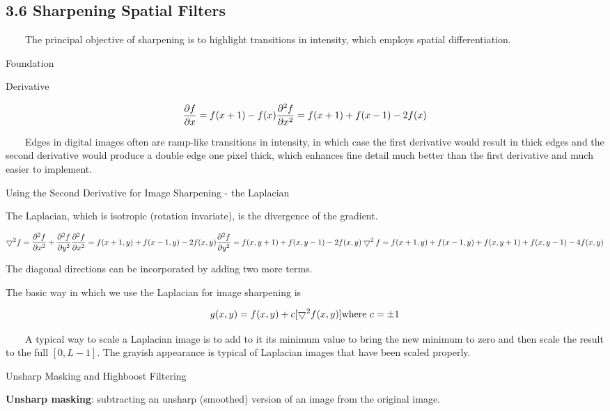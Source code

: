 \documentclass[]{article}
\begin{document}
\subsection{3.6 Sharpening Spatial Filters}\label{header-n299}

\(\quad\quad\)The principal objective of sharpening is to highlight
transitions in intensity, which employs spatial differentiation.

Foundation

Derivative

\[\dfrac{\partial f}{\partial x}=f(x+1)-f(x) \\
\dfrac{\partial^2 f}{\partial x^2}=f(x+1)+f(x-1)-2f(x)\]

\(\quad\quad\)Edges in digital images often are ramp-like transitions in
intensity, in which case the first derivative would result in thick
edges and the second derivative would produce a double edge one pixel
thick, which enhances fine detail much better than the first derivative
and much easier to implement.

Using the Second Derivative for Image Sharpening - the Laplacian

The Laplacian, which is isotropic (rotation invariate), is the
divergence of the gradient.

\[\bigtriangledown^2f=\dfrac{\partial^2f}{\partial x^2}+\dfrac{\partial^2f}{\partial y^2}\\
\dfrac{\partial^2f}{\partial x^2}=f(x+1,y)+f(x-1,y)-2f(x,y)\\
\dfrac{\partial^2f}{\partial y^2}=f(x,y+1)+f(x,y-1)-2f(x,y)\\
\bigtriangledown^2f=f(x+1,y)+f(x-1,y)+f(x,y+1)+f(x,y-1)-4f(x,y)\]

The diagonal directions can be incorporated by adding two more terms.

The basic way in which we use the Laplacian for image sharpening is

\[g(x,y)=f(x,y)+c[\bigtriangledown^2 f(x,y)]\\
\text{where $c=\pm1$}\]

\(\quad\quad\)A typical way to scale a Laplacian image is to add to it
its minimum value to bring the new minimum to zero and then scale the
result to the full \([0,L-1]\). The grayish appearance is typical of
Laplacian images that have been scaled properly.

Unsharp Masking and Highboost Filtering

\textbf{Unsharp masking}: subtracting an unsharp (smoothed) version of
an image from the original image.\\
\end{document}

